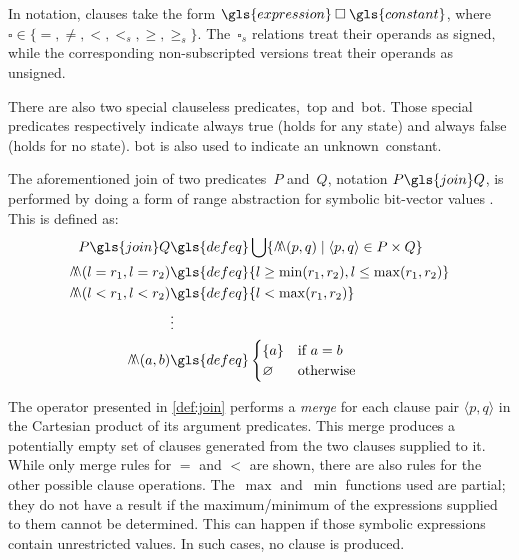 In notation, clauses
take the form $\gls{expression} \mathbin{\square} \gls{constant}$,%
%
where $\square\in\{=,\neq,<,<_s,\ge,\ge_s\}$.
The~$\square_s$ relations treat their operands as signed,
while the corresponding non-subscripted versions treat their operands as unsigned.

There are also two special clauseless predicates,~\gls{top}%
and~\gls{bot}.
Those special predicates respectively indicate always true (holds for any state) and always false (holds for no state).
\Gls{bot} is also used to indicate an unknown~\gls{constant}.%
\begin{definition}\label{def:join}
  The aforementioned join
  of two predicates~$P$ and~$Q$,%
  notation $P\gls{join}Q$,
  is performed by doing a form of range abstraction for symbolic bit-vector values \autocite{rugina2000symbolic}.
  This is defined as:
  \begin{align*} %
    P\gls{join}Q &\gls{defeq} \bigcup\{\merge(p,q) \mid \langle p,q\rangle\in P\times Q\} \\
    \merge(l=r_1,l=r_2) &\gls{defeq} \{l\ge\min(r_1,r_2),l\le\max(r_1,r_2)\} \\
    \merge(l<r_1,l<r_2) &\gls{defeq} \{l<\max(r_1,r_2)\} \\
    &\vdots\\
    \merge(a,b) &\gls{defeq}
    \begin{cases}
      \{a\} & \text{if }a=b \\
      \varnothing & \text{otherwise}
    \end{cases}
  \end{align*}
\end{definition}
The operator presented in \cref{def:join}
performs a \emph{merge} for each clause pair
$\langle p,q\rangle$
in the Cartesian product %
of its argument predicates.
This merge produces a potentially empty set of clauses
generated from the two clauses supplied to it.
While only merge rules for $=$ and $<$ are shown, there are also rules
for the other possible clause operations.
The~$\max$ and~$\min$ functions used are partial;%
%
%
they do not have a result if the maximum/minimum of the expressions supplied to them cannot be determined.%
This can happen if those symbolic expressions
contain unrestricted values.
In such cases, no clause is produced.

